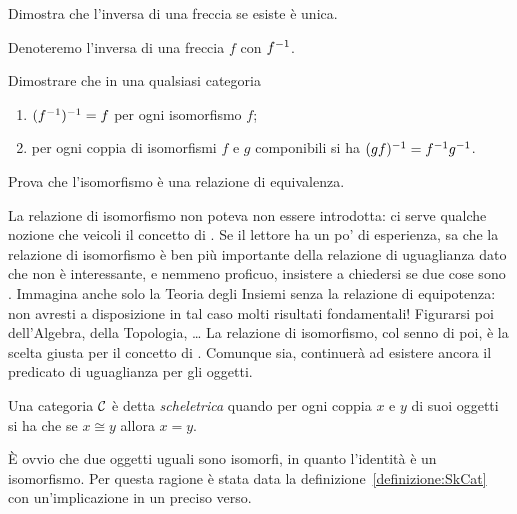 \begin{esercizio}
Dimostra che l'inversa di una freccia se esiste è unica.
\end{esercizio}

Denoteremo l'inversa di una freccia \(f\) con \(f^{-1}\).

\begin{esercizio}
Dimostrare che in una qualsiasi categoria
\begin{enumerate}
\item \((f^{-1})^{-1} = f\) per ogni isomorfismo \(f\);
\item per ogni coppia di isomorfismi \(f\) e \(g\) componibili si ha \((gf)^{-1} = f^{-1} g^{-1}\).
\end{enumerate}
\end{esercizio}

\begin{esercizio}\label{esercizio:CongIsIso}
Prova che l'isomorfismo è una relazione di equivalenza.
\end{esercizio}

\begin{nota}
La relazione di isomorfismo non poteva non essere introdotta: ci serve qualche nozione che veicoli il concetto di . Se il lettore ha un po' di esperienza, sa che la relazione di isomorfismo è ben più importante della relazione di uguaglianza dato che non è interessante, e nemmeno proficuo, insistere a chiedersi se due cose sono . Immagina anche solo la Teoria degli Insiemi senza la relazione di equipotenza: non avresti a disposizione in tal caso molti risultati fondamentali! Figurarsi poi dell'Algebra, della Topologia, \dots{}\newline
La relazione di isomorfismo, col senno di poi, è la scelta giusta per il concetto di . Comunque sia, continuerà ad esistere ancora il predicato di uguaglianza per gli oggetti.
\end{nota}

\begin{definizione}\label{definizione:SkCat}
Una categoria \(\mathcal C\) è detta {\em scheletrica} quando per ogni coppia \(x\) e \(y\) di suoi oggetti si ha che se \(x \cong y\) allora \(x = y\).
\end{definizione}

\begin{nota}
È ovvio che due oggetti uguali sono isomorfi, in quanto l'identità è un isomorfismo. Per questa ragione è stata data la definizione~\ref{definizione:SkCat} con un'implicazione in un preciso verso.
\end{nota}

